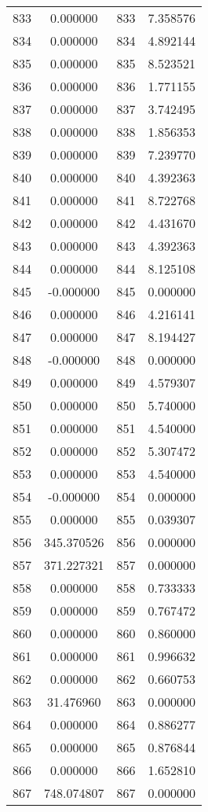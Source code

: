 \documentclass[12pt]{article}
\begin{document}
\begin{longtable}{@{}cccc@{}}
833 & 0.000000 & 833 & 7.358576 \\
834 & 0.000000 & 834 & 4.892144 \\
835 & 0.000000 & 835 & 8.523521 \\
836 & 0.000000 & 836 & 1.771155 \\
837 & 0.000000 & 837 & 3.742495 \\
838 & 0.000000 & 838 & 1.856353 \\
839 & 0.000000 & 839 & 7.239770 \\
840 & 0.000000 & 840 & 4.392363 \\
841 & 0.000000 & 841 & 8.722768 \\
842 & 0.000000 & 842 & 4.431670 \\
843 & 0.000000 & 843 & 4.392363 \\
844 & 0.000000 & 844 & 8.125108 \\
845 & -0.000000 & 845 & 0.000000 \\
846 & 0.000000 & 846 & 4.216141 \\
847 & 0.000000 & 847 & 8.194427 \\
848 & -0.000000 & 848 & 0.000000 \\
849 & 0.000000 & 849 & 4.579307 \\
850 & 0.000000 & 850 & 5.740000 \\
851 & 0.000000 & 851 & 4.540000 \\
852 & 0.000000 & 852 & 5.307472 \\
853 & 0.000000 & 853 & 4.540000 \\
854 & -0.000000 & 854 & 0.000000 \\
855 & 0.000000 & 855 & 0.039307 \\
856 & 345.370526 & 856 & 0.000000 \\
857 & 371.227321 & 857 & 0.000000 \\
858 & 0.000000 & 858 & 0.733333 \\
859 & 0.000000 & 859 & 0.767472 \\
860 & 0.000000 & 860 & 0.860000 \\
861 & 0.000000 & 861 & 0.996632 \\
862 & 0.000000 & 862 & 0.660753 \\
863 & 31.476960 & 863 & 0.000000 \\
864 & 0.000000 & 864 & 0.886277 \\
865 & 0.000000 & 865 & 0.876844 \\
866 & 0.000000 & 866 & 1.652810 \\
867 & 748.074807 & 867 & 0.000000 \\

\end{longtable}
\end{document}
